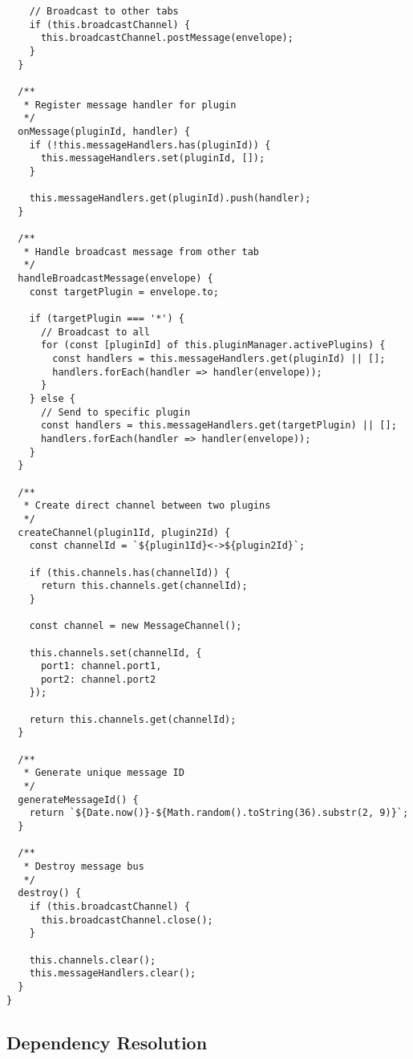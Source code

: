 \documentclass[11pt]{article}
\begin{document}
\begin{verbatim}
    // Broadcast to other tabs
    if (this.broadcastChannel) {
      this.broadcastChannel.postMessage(envelope);
    }
  }
  
  /**
   * Register message handler for plugin
   */
  onMessage(pluginId, handler) {
    if (!this.messageHandlers.has(pluginId)) {
      this.messageHandlers.set(pluginId, []);
    }
    
    this.messageHandlers.get(pluginId).push(handler);
  }
  
  /**
   * Handle broadcast message from other tab
   */
  handleBroadcastMessage(envelope) {
    const targetPlugin = envelope.to;
    
    if (targetPlugin === '*') {
      // Broadcast to all
      for (const [pluginId] of this.pluginManager.activePlugins) {
        const handlers = this.messageHandlers.get(pluginId) || [];
        handlers.forEach(handler => handler(envelope));
      }
    } else {
      // Send to specific plugin
      const handlers = this.messageHandlers.get(targetPlugin) || [];
      handlers.forEach(handler => handler(envelope));
    }
  }
  
  /**
   * Create direct channel between two plugins
   */
  createChannel(plugin1Id, plugin2Id) {
    const channelId = `${plugin1Id}<->${plugin2Id}`;
    
    if (this.channels.has(channelId)) {
      return this.channels.get(channelId);
    }
    
    const channel = new MessageChannel();
    
    this.channels.set(channelId, {
      port1: channel.port1,
      port2: channel.port2
    });
    
    return this.channels.get(channelId);
  }
  
  /**
   * Generate unique message ID
   */
  generateMessageId() {
    return `${Date.now()}-${Math.random().toString(36).substr(2, 9)}`;
  }
  
  /**
   * Destroy message bus
   */
  destroy() {
    if (this.broadcastChannel) {
      this.broadcastChannel.close();
    }
    
    this.channels.clear();
    this.messageHandlers.clear();
  }
}
\end{verbatim}
\subsection{Dependency Resolution}
\label{sec:org7b7c566}
\end{document}
